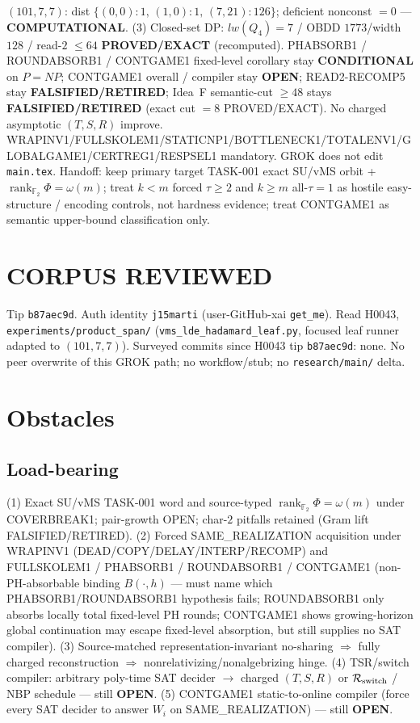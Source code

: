 \documentclass[11pt]{article}
\begin{document}
$(101,7,7)$: dist $\{(0,0){:}1,\,(1,0){:}1,\,(7,21){:}126\}$; deficient nonconst $=0$ ---
\textbf{COMPUTATIONAL}.
(3) Closed-set DP: $lw(Q_4)=7$ / OBDD $1773$/width $128$ / read-$2$ $\le64$
\textbf{PROVED/EXACT} (recomputed).
PHABSORB1 / ROUNDABSORB1 / CONTGAME1 fixed-level corollary stay \textbf{CONDITIONAL} on $P=NP$;
CONTGAME1 overall / compiler stay \textbf{OPEN}; READ2-RECOMP5 stay \textbf{FALSIFIED/RETIRED};
Idea~F semantic-cut $\ge48$ stays \textbf{FALSIFIED/RETIRED} (exact cut $=8$ PROVED/EXACT).
No charged asymptotic $(T,S,R)$ improve.
WRAPINV1/FULLSKOLEM1/STATICNP1/BOTTLENECK1/TOTALENV1/GLOBALGAME1/CERTREG1/RESPSEL1 mandatory.
GROK does not edit \texttt{main.tex}.
Handoff: keep primary target TASK-001 exact SU/vMS orbit + $\operatorname{rank}_{\mathbb F_2}\Phi=\omega(m)$;
treat $k{<}m$ forced $\tau{\ge}2$ and $k{\ge}m$ all-$\tau{=}1$ as hostile easy-structure /
encoding controls, not hardness evidence; treat CONTGAME1 as semantic upper-bound
classification only.

\section*{CORPUS REVIEWED}
Tip \texttt{b87aec9d}. Auth identity \texttt{j15marti} (user-GitHub-xai \texttt{get\_me}).
Read H0043, \texttt{experiments/product\_span/}
(\texttt{vms\_lde\_hadamard\_leaf.py}, focused leaf runner adapted to $(101,7,7)$).
Surveyed commits since H0043 tip \texttt{b87aec9d}: none.
No peer overwrite of this GROK path; no workflow/stub; no \texttt{research/main/} delta.

\section*{Obstacles}
\subsection*{Load-bearing}
(1) Exact SU/vMS TASK-001 word and source-typed
$\operatorname{rank}_{\mathbb F_2}\Phi=\omega(m)$ under COVERBREAK1; pair-growth OPEN;
char-$2$ pitfalls retained (Gram lift FALSIFIED/RETIRED).
(2) Forced SAME\_REALIZATION acquisition under WRAPINV1
(DEAD/COPY/DELAY/INTERP/RECOMP) and FULLSKOLEM1 / PHABSORB1 / ROUNDABSORB1 / CONTGAME1
(non-PH-absorbable binding $B(\cdot,h)$ --- must name which PHABSORB1/ROUNDABSORB1
hypothesis fails; ROUNDABSORB1 only absorbs locally total fixed-level PH rounds;
CONTGAME1 shows growing-horizon global continuation may escape fixed-level absorption,
but still supplies no SAT compiler).
(3) Source-matched representation-invariant no-sharing $\Rightarrow$ fully charged reconstruction
$\Rightarrow$ nonrelativizing/nonalgebrizing hinge.
(4) TSR/switch compiler: arbitrary poly-time SAT decider $\to$ charged $(T,S,R)$ or
$\mathcal R_{\rm switch}$ / NBP schedule --- still \textbf{OPEN}.
(5) CONTGAME1 static-to-online compiler (force every SAT decider to answer $W_i$ on
SAME\_REALIZATION) --- still \textbf{OPEN}.
\end{document}

